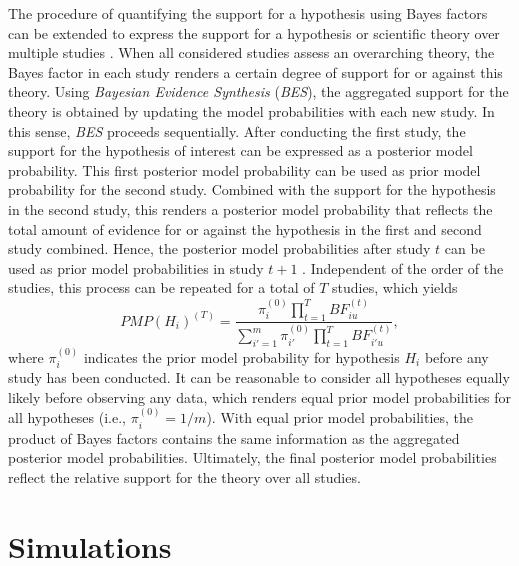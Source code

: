 \documentclass[
]{article}
\begin{document}
The procedure of quantifying the support for a hypothesis using Bayes
factors can be extended to express the support for a hypothesis or
scientific theory over multiple studies \citep{kuiper_combining_2013}.
When all considered studies assess an overarching theory, the Bayes
factor in each study renders a certain degree of support for or against
this theory. Using \emph{Bayesian Evidence Synthesis} (\emph{BES}), the
aggregated support for the theory is obtained by updating the model
probabilities with each new study. In this sense, \emph{BES} proceeds
sequentially. After conducting the first study, the support for the
hypothesis of interest can be expressed as a posterior model
probability. This first posterior model probability can be used as prior
model probability for the second study. Combined with the support for
the hypothesis in the second study, this renders a posterior model
probability that reflects the total amount of evidence for or against
the hypothesis in the first and second study combined. Hence, the
posterior model probabilities after study \(t\) can be used as prior
model probabilities in study \(t + 1\) \citep{kuiper_combining_2013}.
Independent of the order of the studies, this process can be repeated
for a total of \(T\) studies, which yields \[
PMP(H_i)^{(T)} = \frac{
  \pi^{(0)}_{i} \prod^T_{t=1} BF^{(t)}_{iu}
}{
  \sum^m_{i'=1} \pi^{(0)}_{i'} \prod^T_{t=1} BF^{(t)}_{i'u}
},
\] where \(\pi^{(0)}_i\) indicates the prior model probability for
hypothesis \(H_i\) before any study has been conducted. It can be
reasonable to consider all hypotheses equally likely before observing
any data, which renders equal prior model probabilities for all
hypotheses (i.e., \(\pi^{(0)}_i = 1/m\)). With equal prior model
probabilities, the product of Bayes factors contains the same
information as the aggregated posterior model probabilities. Ultimately,
the final posterior model probabilities reflect the relative support for
the theory over all studies.

\hypertarget{simulations}{%
\section{Simulations}\label{simulations}}
\end{document}
